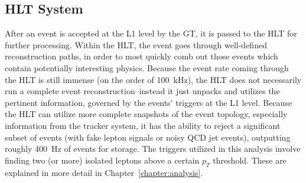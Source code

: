 \subsection{HLT System}
After an event is accepted at the L1 level by the GT, it is passed to the
HLT for further processing. Within the HLT, the event goes through 
well-defined reconstruction paths, in order to most quickly comb out those events
which contain potentially interesting physics. Because the event rate coming
through the HLT is still immense (on the order of 100~kHz), the HLT does not
necessarily run a complete event reconstruction--instead it just unpacks and
utilizes the pertinent information, governed by the events' triggers at the L1
level. Because the HLT can utilize more complete snapshots of the event
topology, especially information from the tracker system, it has the ability to
reject a significant subset of events (with fake lepton signals or noisy QCD jet
events), outputting roughly 400~Hz of events for storage.
The triggers utilized in this analysis involve finding two (or more)
isolated leptons above a certain $p_T$ threshold. These are explained in more
detail in Chapter~\ref{chapter:analysis}.
